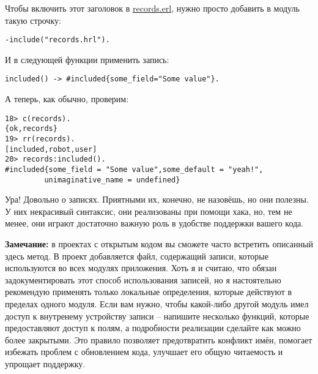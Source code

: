 Чтобы включить этот заголовок в \href{http://learnyousomeerlang.com/static/erlang/records.erl}{records.erl}, нужно просто добавить в модуль такую строчку:
\begin{lstlisting}[style=erlang,]
-include("records.hrl").
\end{lstlisting}

И в следующей функции применить запись:
\begin{lstlisting}[style=erlang]
included() -> #included{some_field="Some value"}.
\end{lstlisting}

А теперь, как обычно, проверим:
\begin{lstlisting}[style=erlang]
18> c(records).
{ok,records}
19> rr(records).
[included,robot,user]
20> records:included().
#included{some_field = "Some value",some_default = "yeah!",
         unimaginative_name = undefined}
\end{lstlisting}

Ура!
Довольно о записях.
Приятными их, конечно, не назовёшь, но они полезны.
У них некрасивый синтаксис, они реализованы при помощи хака, но, тем не менее, они играют достаточно важную роль в удобстве поддержки вашего кода.\\
\colorbox{lgray}
{
\begin{minipage}{1.0\linewidth}
    \textbf{Замечание:} в проектах с открытым кодом вы сможете часто встретить описанный здесь метод.
В проект добавляется  файл, содержащий записи, которые используются во всех модулях приложения.
Хоть я и считаю, что обязан задокументировать этот способ использования записей, но я настоятельно рекомендую применять только локальные определения, которые действуют в пределах одного модуля.
Если вам нужно, чтобы какой\--либо другой модуль имел доступ к внутренему устройству записи \--- напишите несколько функций, которые предоставляют доступ к полям, а подробности реализации сделайте как можно более закрытыми.
Это правило позволяет предотвратить конфликт имён, помогает избежать проблем с обновлением кода, улучшает его общую читаемость и упрощает поддержку.
\end{minipage}
}
